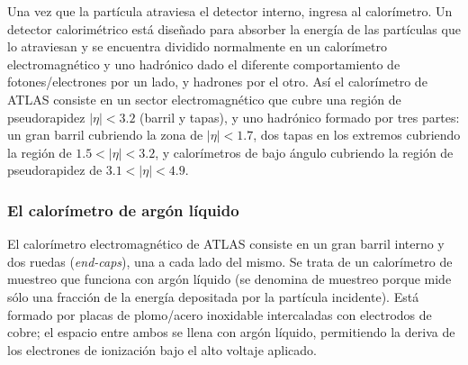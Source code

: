    Una vez que la part\'icula atraviesa el detector interno, ingresa al calor\'imetro. Un detector calorim\'etrico est\'a dise\~nado para absorber la energ\'ia de las part\'iculas que lo atraviesan y se encuentra dividido normalmente en un calor\'imetro electromagn\'etico y uno hadr\'onico dado el diferente comportamiento de fotones/electrones por un lado, y hadrones por el otro.  As\'i el calor\'imetro de ATLAS consiste en un sector electromagn\'etico que cubre una regi\'on de pseudorapidez $|\eta|<3.2$ (barril y tapas),  y uno hadr\'onico formado por tres partes: un gran barril cubriendo la zona de $|\eta|<1.7$, dos tapas en los extremos cubriendo la regi\'on de $1.5<|\eta|<3.2$, y calor\'imetros de bajo \'angulo cubriendo la regi\'on de pseudorapidez de  $3.1 <|\eta|< 4.9$. %

\subsubsection{El calor\'imetro de arg\'on l\'iquido}
  
   El calor\'imetro electromagn\'etico de ATLAS consiste en un gran barril interno y dos ruedas (\emph{end-caps}), una a cada lado del mismo. Se trata de un calor\'imetro de muestreo que funciona con arg\'on l\'iquido (se denomina de muestreo porque mide s\'olo una fracci\'on de la energ\'ia depositada por la part\'icula incidente). Est\'a formado por placas de plomo/acero inoxidable intercaladas con electrodos de cobre; el espacio entre ambos se llena con arg\'on l\'iquido, permitiendo la deriva de los electrones de ionizaci\'on bajo el alto voltaje aplicado. 

